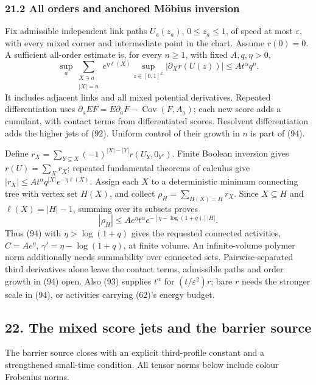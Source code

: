 \documentclass[11pt,a4paper]{article}
\begin{document}
\hypertarget{all-orders-and-anchored-muxf6bius-inversion}{%
\subsubsection{21.2 All orders and anchored Möbius
inversion}\label{all-orders-and-anchored-muxf6bius-inversion}}

Fix admissible independent link paths \(U_a(z_a)\), \(0\le z_a\le1\), of
speed at most \(\varepsilon\), with every mixed corner and intermediate
point in the chart. Assume \(r(0)=0\). A sufficient all-order estimate
is, for every \(n\ge1\), with fixed \(A,q,\eta>0\),
\[\sup_a\sum_{\substack{X\ni a\\|X|=n}}
 e^{\eta\ell(X)}\sup_{z\in[0,1]^{\mathcal E}}
 |\partial_X r(U(z))|\le A t^\alpha q^n.\tag{94}\] It includes adjacent
links and all mixed potential derivatives. Repeated differentiation uses
\(\partial_a E F=E\partial_aF-\operatorname{Cov}(F,A_a)\); each new
score adds a cumulant, with contact terms from differentiated scores.
Resolvent differentiation adds the higher jets of (92). Uniform control
of their growth in \(n\) is part of (94).

Define \(r_X=\sum_{Y\subseteq X}(-1)^{|X|-|Y|}r(U_Y,0_{Y^c})\). Finite
Boolean inversion gives \(r(U)=\sum_Xr_X\); repeated fundamental
theorems of calculus give
\(|r_X|\le At^\alpha q^{|X|}e^{-\eta\ell(X)}\). Assign each \(X\) to a
deterministic minimum connecting tree with vertex set \(H(X)\), and
collect \(\rho_H=\sum_{H(X)=H}r_X\). Since \(X\subseteq H\) and
\(\ell(X)=|H|-1\), summing over its subsets proves
\[|\rho_H|\le Ae^\eta t^\alpha
 e^{-[\eta-\log(1+q)]|H|}.\tag{95}\] Thus (94) with \(\eta>\log(1+q)\)
gives the requested connected activities, \(C=Ae^\eta\),
\(\gamma'=\eta-\log(1+q)\), at finite volume. An infinite-volume polymer
norm additionally needs summability over connected sets.
Pairwise-separated third derivatives alone leave the contact terms,
admissible paths and order growth in (94) open. Also (93) supplies
\(t^\alpha\) for \((t/\varepsilon^2)r\); bare \(r\) needs the stronger
scale in (94), or activities carrying (62)'s energy budget.

\hypertarget{the-mixed-score-jets-and-the-barrier-source}{%
\subsection{22. The mixed score jets and the barrier
source}\label{the-mixed-score-jets-and-the-barrier-source}}

The barrier source closes with an explicit third-profile constant and a
strengthened small-time condition. All tensor norms below include colour
Frobenius norms.
\end{document}

